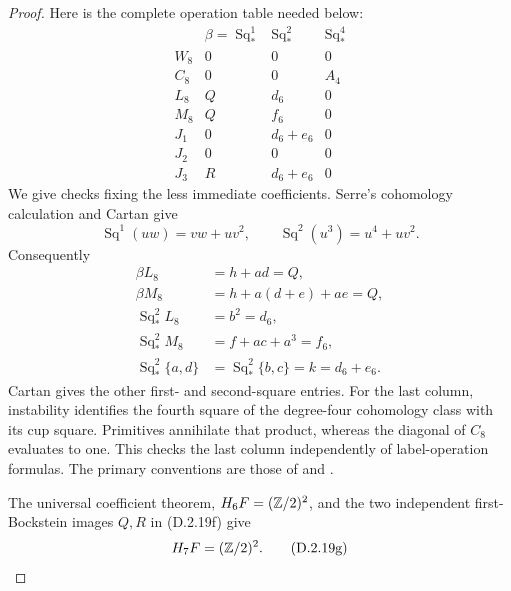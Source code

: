 \begin{proof}
Here is the complete operation table needed below:
\[
\begin{array}{c|c|c|c}
 &\beta=\operatorname{Sq}_*^1&\operatorname{Sq}_*^2
                         &\operatorname{Sq}_*^4\\ \hline
 W_8&0&0&0\\
 C_8&0&0&A_4\\
 L_8&Q&d_6&0\\
 M_8&Q&f_6&0\\
 J_1&0&d_6+e_6&0\\
 J_2&0&0&0\\
 J_3&R&d_6+e_6&0
\end{array}
 \tag{D.2.19f}
\]
We give checks fixing the less immediate coefficients.
Serre's cohomology calculation and Cartan give
\[
 \operatorname{Sq}^1(uw)=vw+uv^2,
 \qquad \operatorname{Sq}^2(u^3)=u^4+uv^2.
\]
Consequently
\[
\begin{split}
 \beta L_8&=h+ad=Q,\\
 \beta M_8&=h+a(d+e)+ae=Q,\\
 \operatorname{Sq}_*^2L_8&=b^2=d_6,\\
 \operatorname{Sq}_*^2M_8&=f+ac+a^3=f_6,\\
 \operatorname{Sq}_*^2\{a,d\}
 &=\operatorname{Sq}_*^2\{b,c\}=k=d_6+e_6.
\end{split}
\]
Cartan gives the other first- and second-square entries.
For the last column, instability identifies the fourth
square of the degree-four cohomology class with its cup
square. Primitives annihilate that product, whereas the
diagonal of $C_8$ evaluates to one. This checks the last
column independently of label-operation formulas.
The primary conventions are those of
\cite[\S2, nos.~8--9]{I_Serre1953} and
\cite[Chapter~III, Theorems~3.1--3.2]{I_CohenLadaMay1976}.

The universal coefficient theorem, $H_6F=(\mathbb Z/2)^2$,
and the two independent first-Bockstein images $Q,R$
in \textup{(D.2.19f)} give
\[
 H_7F=(\mathbb Z/2)^2.
 \tag{D.2.19g}
\]


\end{proof}

